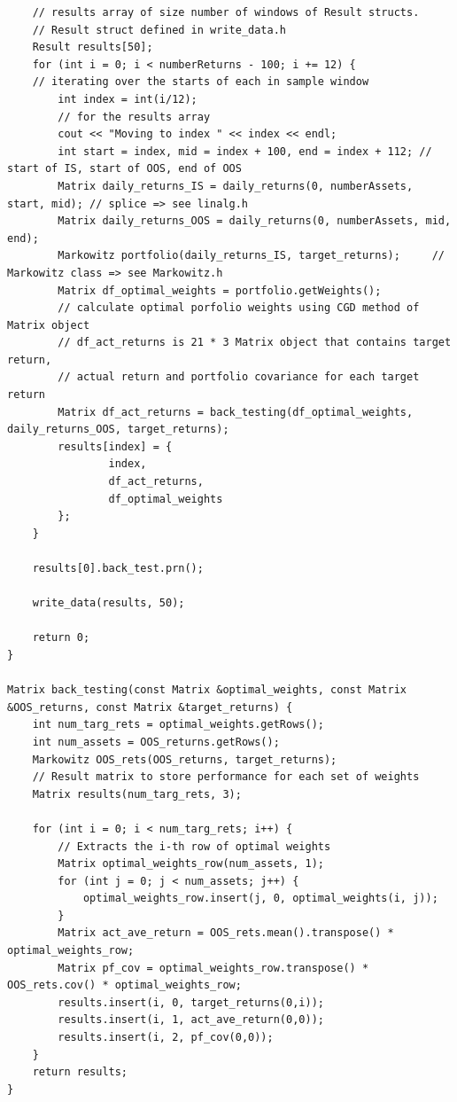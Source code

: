 \documentclass[12pt,twoside]{article}
\begin{document}
\begin{verbatim}
    // results array of size number of windows of Result structs.
    // Result struct defined in write_data.h
    Result results[50];
    for (int i = 0; i < numberReturns - 100; i += 12) {             
    // iterating over the starts of each in sample window
        int index = int(i/12);
        // for the results array
        cout << "Moving to index " << index << endl;
        int start = index, mid = index + 100, end = index + 112; // start of IS, start of OOS, end of OOS
        Matrix daily_returns_IS = daily_returns(0, numberAssets, start, mid); // splice => see linalg.h
        Matrix daily_returns_OOS = daily_returns(0, numberAssets, mid, end);
        Markowitz portfolio(daily_returns_IS, target_returns);     // Markowitz class => see Markowitz.h
        Matrix df_optimal_weights = portfolio.getWeights();            
        // calculate optimal porfolio weights using CGD method of Matrix object
        // df_act_returns is 21 * 3 Matrix object that contains target return,
        // actual return and portfolio covariance for each target return
        Matrix df_act_returns = back_testing(df_optimal_weights, daily_returns_OOS, target_returns);
        results[index] = {
                index,
                df_act_returns,
                df_optimal_weights
        };
    }

    results[0].back_test.prn();

    write_data(results, 50);

    return 0;
}

Matrix back_testing(const Matrix &optimal_weights, const Matrix &OOS_returns, const Matrix &target_returns) {
    int num_targ_rets = optimal_weights.getRows();
    int num_assets = OOS_returns.getRows();
    Markowitz OOS_rets(OOS_returns, target_returns);
    // Result matrix to store performance for each set of weights
    Matrix results(num_targ_rets, 3);

    for (int i = 0; i < num_targ_rets; i++) {
        // Extracts the i-th row of optimal weights
        Matrix optimal_weights_row(num_assets, 1);
        for (int j = 0; j < num_assets; j++) {
            optimal_weights_row.insert(j, 0, optimal_weights(i, j));
        }
        Matrix act_ave_return = OOS_rets.mean().transpose() * optimal_weights_row;
        Matrix pf_cov = optimal_weights_row.transpose() * OOS_rets.cov() * optimal_weights_row;
        results.insert(i, 0, target_returns(0,i));
        results.insert(i, 1, act_ave_return(0,0));
        results.insert(i, 2, pf_cov(0,0));
    }
    return results;
}
\end{verbatim}
\end{document}
